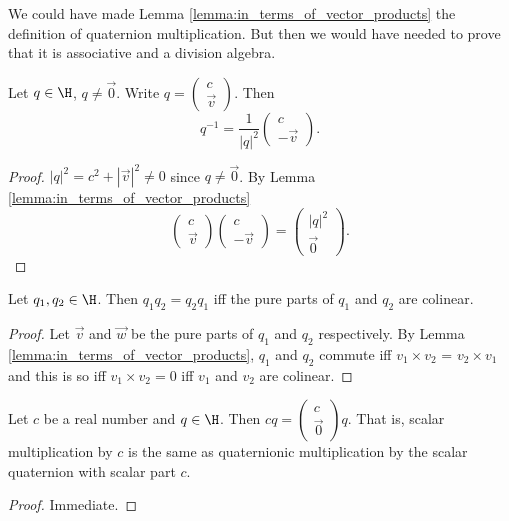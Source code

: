 \documentclass[oneside,12pt]{amsart}
\begin{document}
\begin{note}
We could have made Lemma \ref{lemma:in_terms_of_vector_products} the definition of quaternion
multiplication. But then we would have needed to prove that it is associative and
a division algebra.
\end{note}

\begin{lemma}
Let $q\in\H$, $q\not=\vec{0}$.
Write $q=\begin{pmatrix}c\\ \vec{v}\end{pmatrix}$. Then
$$q^{-1} = \frac{1}{|q|^2}\begin{pmatrix}c\\ -\vec{v}\end{pmatrix}.$$
\end{lemma}
\begin{proof}
$|q|^2 = c^2 + |\vec{v}|^2 \not= 0$ since $q\not=\vec{0}$.
By 
Lemma \ref{lemma:in_terms_of_vector_products}
$$\begin{pmatrix}c\\ \vec{v}\end{pmatrix}\begin{pmatrix}c\\ -\vec{v}\end{pmatrix}=
\begin{pmatrix}|q|^2\\ \vec{0}\end{pmatrix}.$$
\end{proof}

\begin{lemma}
\label{lemma:commute_criterion}
Let $q_1, q_2 \in \H$. Then $q_1 q_2 = q_2 q_1$ iff 
the pure parts of $q_1$ and $q_2$ are colinear.
\end{lemma}
\begin{proof}
Let $\vec{v}$ and $\vec{w}$ be the pure parts of $q_1$ and $q_2$ respectively.
By Lemma \ref{lemma:in_terms_of_vector_products}, $q_1$ and $q_2$ commute
iff $v_1 \times v_2$ = $v_2 \times v_1$ and this is so iff
$v_1 \times v_2 = 0$ iff $v_1$ and $v_2$ are colinear.
\end{proof}

\begin{lemma}
Let $c$ be a real number and $q\in\H$.
Then $cq = \begin{pmatrix}c\\ \vec{0}\end{pmatrix} q$. That is,
scalar multiplication by $c$ is the same as quaternionic
multiplication by the scalar quaternion with scalar part $c$.
\end{lemma}
\begin{proof}
Immediate.
\end{proof}
\end{document}

